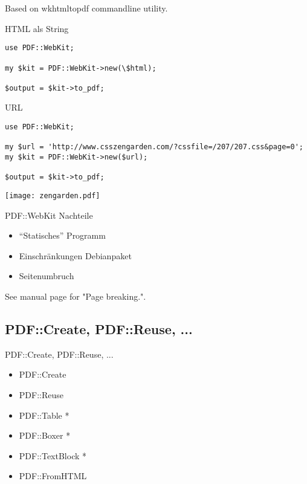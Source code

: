 Based on wkhtmltopdf commandline utility.

\begin{frame}[fragile]{HTML als String}
\begin{lstlisting}
use PDF::WebKit;

my $kit = PDF::WebKit->new(\$html);

$output = $kit->to_pdf;
\end{lstlisting}
\end{frame}

\begin{frame}[fragile]{URL}
\begin{lstlisting}
use PDF::WebKit;

my $url = 'http://www.csszengarden.com/?cssfile=/207/207.css&page=0';
my $kit = PDF::WebKit->new($url);

$output = $kit->to_pdf;
\end{lstlisting}
\end{frame}

\begin{frame}
\texttt{[image: zengarden.pdf]}
\end{frame}

\begin{frame}{PDF::WebKit Nachteile}
  \begin{itemize}
  \item ``Statisches'' Programm
  \item Einschränkungen Debianpaket
  \item Seitenumbruch
  \end{itemize}
\end{frame}

See manual page for "Page breaking.".


\subsection{PDF::Create, PDF::Reuse, ...}

\begin{frame}{PDF::Create, PDF::Reuse, ...}
\begin{itemize}
\item PDF::Create
\item PDF::Reuse
\item PDF::Table *
\item PDF::Boxer *
\item PDF::TextBlock *
\item PDF::FromHTML
\end{itemize}
\end{frame}

